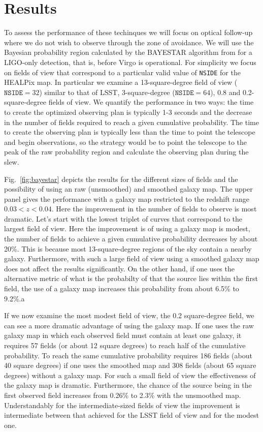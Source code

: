 \documentclass[useAMS,usenatbib]{mn2e}
\begin{document}
\section{Results}

To assess the performance of these techinques we will focus on optical
follow-up where we do not wish to observe through the zone of
avoidance.  We will use the Bayesian probability region calculated by
the BAYESTAR algorithm \citep{2015arXiv150803634S} from
\citet{2014ApJ...795..105S} for a LIGO-only detection, that is, before
Virgo is operational.  For simplicity we focus on fields of view that
correspond to a particular valid value of \texttt{NSIDE} for the
HEALPix map.  In particular we examine a 13-square-degree field of
view ($\mathtt{NSIDE}=32$) similar to that of LSST, 3-square-degree
($\mathtt{NSIDE}=64$), 0.8 and 0.2-square-degree fields of view.  We
quantify the performance in two ways: the time to create the optimized
observing plan is typically 1-3 seconds and the decrease in the number
of fields required to reach a given cumulative probability.  The time
to create the observing plan is typically less than the time to point
the telescope and begin observations, so the strategy would be to
point the telescope to the peak of the raw probability region and
calculate the observing plan during the slew.

Fig.~\ref{fig:bayestar} depicts the results for the different sizes of
fields and the possibility of using an raw (unsmoothed) and smoothed
galaxy map.  The upper panel gives the performance with a galaxy map
restricted to the redshift range $0.03<z<0.04$.  Here the improvement
in the number of fields to observe is most dramatic.  Let's start with
the lowest triplet of curves that correspond to the largest field of
view.  Here the improvement is of using a galaxy map is modest, the
number of fields to achieve a given cumulative probability decreases
by about 20\%.  This is because most 13-square-degree regions of the
sky contain a nearby galaxy. Furthermore, with such a large field of
view using a smoothed galaxy map does not affect the results
significantly.  On the other hand, if one uses the alternative metric
of what is the probabilty of that the source lies within the first
field, the use of a galaxy map increases this probability from about
6.5\% to 9.2\%.a

If we now examine the most modest field of view, the 0.2 square-degree
field, we can see a more dramatic advantage of using the galaxy map.
If one uses the raw galaxy map in which each observed field must
contain at least one galaxy, it requires 57 fields (or about 12 square
degrees) to reach half of the cumulative probability.  To reach the
same cumulative probability requires 186 fields (about 40 square
degrees) if one uses the smoothed map and 308 fields (about 65 square
degrees) without a galaxy map.  For such a small field of view the
effectiveness of the galaxy map is dramatic.  Furthermore, the chance
of the source being in the first observed field increases from 0.26\%
to 2.3\% with the unsmoothed map.  Understandably for the
intermediate-sized fields of view the improvement is intermediate
between that achieved for the LSST field of view and for the modest one.
\end{document}
